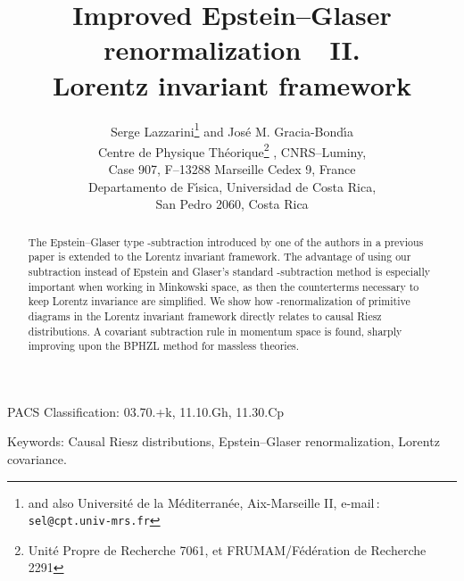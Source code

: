 \documentclass[a4paper,12pt]{article}
\providecommand{\7}{\dagger}           %
\theoremstyle{plain}
\theoremstyle{definition}
\begin{document}
\title{\bf Improved Epstein--Glaser renormalization\ \ II.\\
Lorentz invariant framework}

\author{Serge Lazzarini\coordHE{}\footnote{and also Universit\'e de la
M\'editerran\'ee, Aix-Marseille II, 
e-mail\,: \texttt{sel@cpt.univ-mrs.fr}} \hskip 1.5mm and
Jos\'e M. Gracia-Bond\'{\i}a\coordHE{}\\[1cm]
\coordHE{} Centre de Physique Th\'eorique\footnote{
Unit\'e Propre de Recherche 7061, et FRUMAM/F\'ed\'eration de Recherche 2291}
, CNRS--Luminy,\\
Case 907, F--13288 Marseille Cedex 9, France\\[5mm]
\coordHE{} Departamento de F\'{\i}sica, Universidad de Costa Rica,\\
San Pedro 2060, Costa Rica
}

\maketitle

\vskip 2cm

\begin{abstract}
The Epstein--Glaser type \coordHE{}-subtraction introduced by one of the
authors in a previous paper is extended to the Lorentz invariant
framework. The advantage of using our subtraction instead of Epstein
and Glaser's standard \coordHE{}-subtraction method is especially important
when working in Minkowski space, as then the counterterms necessary to
keep Lorentz invariance are simplified. We show how
\coordHE{}-renormalization of primitive diagrams in the Lorentz invariant
framework directly relates to causal Riesz distributions. A covariant
subtraction rule in momentum space is found, sharply improving upon
the BPHZL method for massless theories.
\end{abstract}

\vskip 1cm

 PACS Classification: 03.70.+k, 11.10.Gh, 11.30.Cp

\noindent Keywords: Causal Riesz distributions, Epstein--Glaser
renormalization, Lorentz covariance.

\indent


\indent

\newpage
\end{document}
